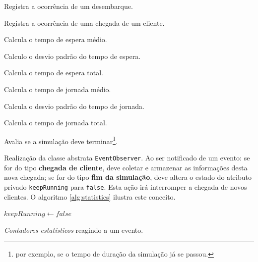 \begin{description}
    \begin{description}[leftmargin=!,labelwidth=\widthof{\bfseries destinationFloor}]
      \item[\texttt{logDropOff}] Registra a ocorrência de um desembarque.
      \item[\texttt{logTrip}] Registra a ocorrência de uma chegada de um cliente.
      \item[\texttt{getAvgWT}] Calcula o tempo de espera médio.
      \item[\texttt{getDevWt}] Calculo o desvio padrão do tempo de espera.
      \item[\texttt{getTotalWT}] Calcula o tempo de espera total.
      \item[\texttt{getAvgWT}] Calcula o tempo de jornada médio.
      \item[\texttt{getDevWt}] Calcula o desvio padrão do tempo de jornada.
      \item[\texttt{getTotalWT}] Calcula o tempo de jornada total.
      \item[\texttt{keepRunning}] Avalia se a simulação deve terminar\footnote{por exemplo, se o tempo de duração da simulação já se passou.}.
      \item[\texttt{notify}]
        Realização da classe abstrata \texttt{EventObserver}. Ao ser notificado
        de um evento: se for do tipo \textbf{chegada de cliente}, deve coletar e
        armazenar as informações desta nova chegada; se for do tipo \textbf{fim
        da simulação}, deve altera o estado do atributo privado
        \texttt{keepRunning} para \texttt{false}. Esta ação irá interromper a
        chegada de novos clientes. O algoritmo \ref{alg:statistics} ilustra este
        conceito.
    \end{description}

\begin{algorithm}[htb]
\begin{center}
\begin{algorithmic}[1]
    \State {}
    \State $keepRunning \leftarrow false$
  \EndIf
\EndFunction
\end{algorithmic}
\end{center}
\caption{\label{alg:statistics}\textit{Contadores estatísticos} reagindo a um evento.}
\end{algorithm}

\end{description}

